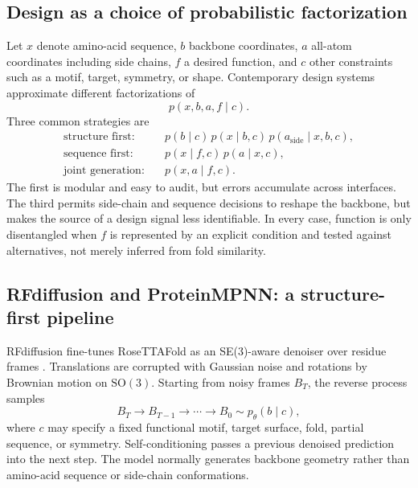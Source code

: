 \documentclass[10pt]{article}
\begin{document}
\subsection{Design as a choice of probabilistic factorization}

Let $x$ denote amino-acid sequence, $b$ backbone coordinates, $a$ all-atom coordinates including
side chains, $f$ a desired function, and $c$ other constraints such as a motif, target, symmetry, or
shape.  Contemporary design systems approximate different factorizations of
\begin{equation}
p(x,b,a,f\mid c).
\label{eq:design-joint}
\end{equation}
Three common strategies are
\begin{align}
\text{structure first:}\quad
&p(b\mid c)\,p(x\mid b,c)\,p(a_{\mathrm{side}}\mid x,b,c),
\label{eq:structure-first-design}\\
\text{sequence first:}\quad
&p(x\mid f,c)\,p(a\mid x,c),
\label{eq:sequence-first-design}\\
\text{joint generation:}\quad
&p(x,a\mid f,c).
\label{eq:joint-protein-design}
\end{align}
The first is modular and easy to audit, but errors accumulate across interfaces.  The third permits
side-chain and sequence decisions to reshape the backbone, but makes the source of a design signal
less identifiable.  In every case, function is only disentangled when $f$ is represented by an
explicit condition and tested against alternatives, not merely inferred from fold similarity.

\subsection{RFdiffusion and ProteinMPNN: a structure-first pipeline}

RFdiffusion fine-tunes RoseTTAFold as an SE(3)-aware denoiser over residue frames
\cite{watson2023}.  Translations are corrupted with Gaussian noise and rotations by Brownian motion
on $\mathrm{SO}(3)$.  Starting from noisy frames $B_T$, the reverse process samples
\begin{equation}
B_T\rightarrow B_{T-1}\rightarrow\cdots\rightarrow B_0
\sim p_{\theta}(b\mid c),
\label{eq:rfdiffusion}
\end{equation}
where $c$ may specify a fixed functional motif, target surface, fold, partial sequence, or symmetry.
Self-conditioning passes a previous denoised prediction into the next step.  The model normally
generates backbone geometry rather than amino-acid sequence or side-chain conformations.
\end{document}

